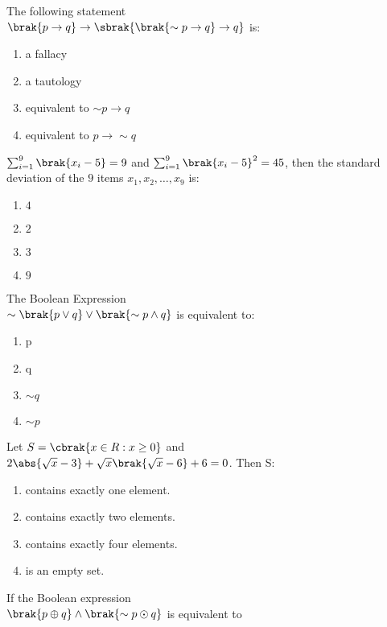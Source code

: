     \item The following statement\\
    $\brak{p\rightarrow q}\rightarrow\sbrak{\brak{\sim p\rightarrow q}\rightarrow q}$ is:\hfill{}
    \begin{enumerate}
        \item a fallacy
        \item a tautology
        \item equivalent to $\sim p\rightarrow q$
        \item equivalent to $p\rightarrow \sim q$ 
    \end{enumerate}
    \item $\sum_{i=1}^{9}\brak{x_i-5}=9$ and $\sum_{i=1}^{9}\brak{x_i-5}^2=45$, then the standard deviation of the $9$ items $x_1,x_2,\dots,x_9$ is:\hfill{}
    \begin{enumerate}
        \item $4$
        \item $2$
        \item $3$
        \item $9$ 
    \end{enumerate}
    \item The Boolean Expression\\
    $\sim\brak{p\vee q}\vee\brak{\sim p\wedge q}$ is equivalent to: \hfill{}
    \begin{enumerate}
        \item p
        \item q
        \item $\sim q$
        \item $\sim p$ 
    \end{enumerate}
    \item Let $S=\cbrak{x\in R:x\geq 0}$ and\\
$2\abs{\sqrt{x}-3}+\sqrt{x}\brak{\sqrt{x}-6}+6=0$. Then S:\hfill{}
\begin{enumerate}
    \item contains exactly one element.
    \item contains exactly two elements.
    \item contains exactly four elements.
    \item is an empty set. 
\end{enumerate}
\item If the Boolean expression\\
$\brak{p\oplus q}\wedge\brak{\sim p\odot q}$ is equivalent to\\
